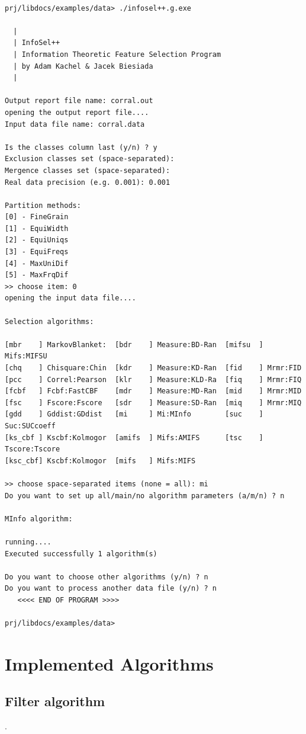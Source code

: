 \documentclass[a4paper,fleqn]{report}
\begin{document}
\begin{scriptsize}
 \begin{verbatim}

prj/libdocs/examples/data> ./infosel++.g.exe

  |
  | InfoSel++
  | Information Theoretic Feature Selection Program
  | by Adam Kachel & Jacek Biesiada
  |

Output report file name: corral.out
opening the output report file....
Input data file name: corral.data

Is the classes column last (y/n) ? y
Exclusion classes set (space-separated):
Mergence classes set (space-separated):
Real data precision (e.g. 0.001): 0.001

Partition methods:
[0] - FineGrain
[1] - EquiWidth
[2] - EquiUniqs
[3] - EquiFreqs
[4] - MaxUniDif
[5] - MaxFrqDif
>> choose item: 0
opening the input data file....

Selection algorithms:

[mbr    ] MarkovBlanket:  [bdr    ] Measure:BD-Ran  [mifsu  ] Mifs:MIFSU
[chq    ] Chisquare:Chin  [kdr    ] Measure:KD-Ran  [fid    ] Mrmr:FID
[pcc    ] Correl:Pearson  [klr    ] Measure:KLD-Ra  [fiq    ] Mrmr:FIQ
[fcbf   ] Fcbf:FastCBF    [mdr    ] Measure:MD-Ran  [mid    ] Mrmr:MID
[fsc    ] Fscore:Fscore   [sdr    ] Measure:SD-Ran  [miq    ] Mrmr:MIQ
[gdd    ] Gddist:GDdist   [mi     ] Mi:MInfo        [suc    ] Suc:SUCcoeff
[ks_cbf ] Kscbf:Kolmogor  [amifs  ] Mifs:AMIFS      [tsc    ] Tscore:Tscore
[ksc_cbf] Kscbf:Kolmogor  [mifs   ] Mifs:MIFS

>> choose space-separated items (none = all): mi
Do you want to set up all/main/no algorithm parameters (a/m/n) ? n

MInfo algorithm:

running....
Executed successfully 1 algorithm(s)

Do you want to choose other algorithms (y/n) ? n
Do you want to process another data file (y/n) ? n
   <<<< END OF PROGRAM >>>>

prj/libdocs/examples/data>
\end{verbatim}
\end{scriptsize}



\chapter{Implemented Algorithms}
\section{Filter algorithm}.
\end{document}
